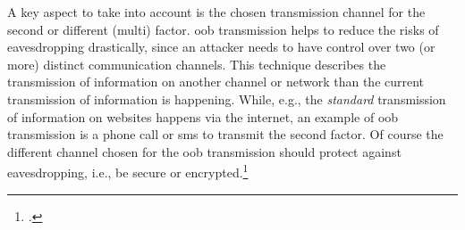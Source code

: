 A key aspect to take into account is the chosen transmission channel for the second or different (multi) factor. \gls{oob} transmission helps to reduce the risks of eavesdropping drastically, since an attacker needs to have control over two (or more) distinct communication channels. This technique describes the transmission of information on another channel or network than the current transmission of information is happening. While, e.g., the \textit{standard} transmission of information on websites happens via the internet, an example of \gls{oob} transmission is a phone call or \gls{sms} to transmit the second factor. Of course the different channel chosen for the \gls{oob} transmission should protect against eavesdropping, i.e., be secure or encrypted.\footcites[See][17]{SP80063B}[See][441]{320284}[See][140]{brotherston2017defensive}[See][106]{2241278}